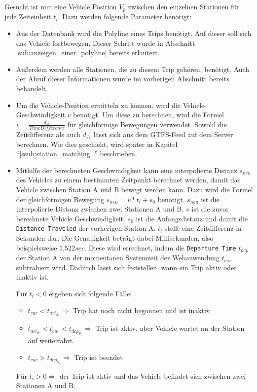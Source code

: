   Gesucht ist nun eine Vehicle Position $V_p$ zwischen den einzelnen Stationen für jede Zeiteinheit $t_i$. Dazu werden folgende Parameter benötigt:

  \begin{itemize}
    \item Aus der Datenbank wird die Polyline eines Trips benötigt. Auf dieser soll sich das Vehicle fortbewegen. Dieser Schritt wurde in Abschnitt \ref{sub:anzeigen_einer_polyline} bereits erläutert.

    \item Außerdem werden alle Stationen, die zu diesem Trip gehören, benötigt. Auch der Abruf dieser Informationen wurde im vorherigen Abschnitt bereits behandelt.

    \item Um die Vehicle-Position ermitteln zu können, wird die Vehicle-Geschwindigkeit $v$ benötigt. Um diese zu berechnen, wird die Formel $v = \frac{d_\triangle}{TimeDifference}$ für gleichförmige Bewegungen verwendet. Sowohl die Zeitdifferenz als auch $d_\triangle$ lässt sich aus dem GTFS-Feed auf dem Server berechnen. Wie dies geschieht, wird später in Kapitel "`\ref{ssub:station_matching} "' beschrieben.

    \item Mithilfe der berechneten Geschwindigkeit kann eine interpolierte Distanz $s_{neu}$ des Vehicles zu einem bestimmten Zeitpunkt berechnet werden, damit das Vehicle zwischen Station A und B bewegt werden kann. Dazu wird die Formel der gleichförmigen Bewegung $s_{neu} = v * t_i + s_0$ benötigt. $s_{neu}$ ist die interpolierte Distanz zwischen zwei Stationen A und B. $v$ ist die zuvor berechnete Vehicle Geschwindigkeit. $s_0$ ist die Anfangsdistanz und damit die \texttt{Distance Traveled} der vorherigen Station A. $t_i$ stellt eine Zeitdifferenz in Sekunden dar. Die Genauigkeit beträgt dabei Millisekunden, also beispielsweise $1.522 sec$. Diese wird errechnet, indem die \texttt{Departure Time} $t_{dep}$ der Station A von der momentanen Systemzeit der Webanwendung $t_{cur}$ subtrahiert wird. Dadurch lässt sich feststellen, wann ein Trip aktiv oder inaktiv ist.

    Für $t_i < 0$ ergeben sich folgende Fälle: 
    \begin{itemize}[label={}]
      \item $t_{cur} < t_{ari_{S_1}} \Rightarrow$ Trip hat noch nicht begonnen und ist inaktiv

      \item $t_{ari_{S_{i}}} < t_{cur} < t_{dep_{S_i}} \Rightarrow$ Trip ist aktiv, aber Vehicle wartet an der Station auf weiterfahrt. 

      \item $t_{cur} > t_{dep_{S_n}} \Rightarrow$ Trip ist beendet
    \end{itemize}

    Für $t_i > 0 \Rightarrow$ der Trip ist aktiv und das Vehicle befindet sich zwischen zwei Stationen A und B.

  \end{itemize}
  
